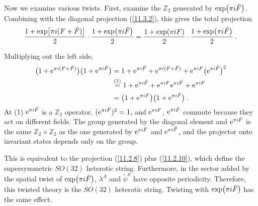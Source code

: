 Now we examine various twists. First, examine the $\mathds{Z}_{2}$ generated by $\exp(\pi i \tilde{F})$. Combining with the diagonal projection (\ref{11.3.2}), this gives the total projection
\begin{equation}
	\frac{1+\exp[\pi i(F+\tilde{F})]}{2}\cdot \frac{1+\exp(\pi i\tilde{F})}{2}
	= \frac{1+\exp(\pi i F)}{2}\cdot \frac{1+\exp(\pi i\tilde{F})}{2} \:. \label{11.3.5}
\end{equation}
\begin{tcolorbox}[breakable]
	\begin{remark}
		Multiplying out the left side,
		\begin{align*}
			\bigl(1+\mathrm{e}^{\pi i(F+\tilde{F})}\bigr)\bigl(1+\mathrm{e}^{\pi i\tilde{F}}\bigr)
			&=1+\mathrm{e}^{\pi i\tilde{F}}+\mathrm{e}^{\pi i(F+\tilde{F})}+\mathrm{e}^{\pi i F}\bigl(\mathrm{e}^{\pi i\tilde{F}}\bigr)^{2}\\
			&\overset{(1)}{=}1+\mathrm{e}^{\pi i\tilde{F}}+\mathrm{e}^{\pi i F}\mathrm{e}^{\pi i\tilde{F}}+\mathrm{e}^{\pi i F}\\
			&=\bigl(1+\mathrm{e}^{\pi i F}\bigr)\bigl(1+\mathrm{e}^{\pi i\tilde{F}}\bigr)\:.
		\end{align*}
		At (1) $\mathrm{e}^{\pi i\tilde{F}}$ is a $\mathds{Z}_{2}$ operator, $(\mathrm{e}^{\pi i\tilde{F}})^{2}=1$, and $\mathrm{e}^{\pi i F}$, $\mathrm{e}^{\pi i\tilde{F}}$ commute because they act on different fields. The group generated by the diagonal element and $\mathrm{e}^{\pi i\tilde{F}}$ is the same $\mathds{Z}_{2}\times\mathds{Z}_{2}$ as the one generated by $\mathrm{e}^{\pi i F}$ and $\mathrm{e}^{\pi i\tilde{F}}$, and the projector onto invariant states depends only on the group.
	\end{remark}
\end{tcolorbox}
This is equivalent to the projection (\ref{11.2.8}) plus (\ref{11.2.10}), which define the supersymmetric $SO(32)$ heterotic string. Furthermore, in the sector added by the spatial twist of $\exp(\pi i\tilde{F})$, $\lambda^{A}$ and $\tilde{\psi}^{\mu}$ have opposite periodicity. Therefore, this twisted theory is the $SO(32)$ heterotic string. Twisting with $\exp(\pi i\tilde{F})$ has the same effect.

